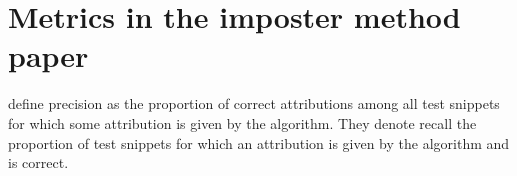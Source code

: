 \section{Metrics in the imposter method paper}
\label{sec:imposter_metrics}

\citet{koppel_determining_2014} define precision as the proportion of correct attributions among all test snippets 
for which some attribution is given by the algorithm.
They denote recall the proportion of test snippets for which an attribution is given by the algorithm and is correct.